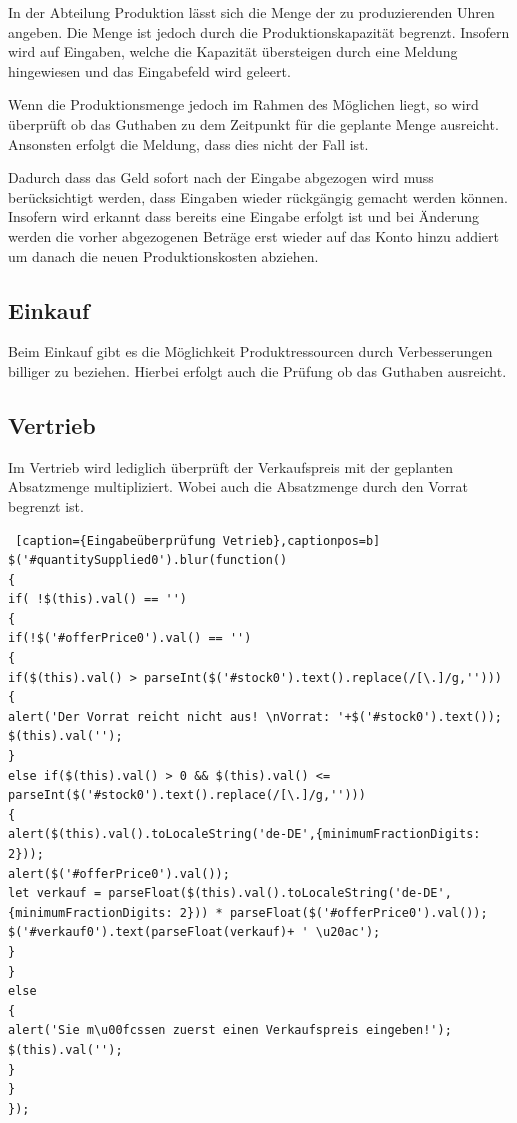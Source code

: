 In der Abteilung Produktion lässt sich die Menge der zu produzierenden Uhren angeben. Die Menge ist jedoch durch die Produktionskapazität begrenzt. Insofern wird auf Eingaben, welche die Kapazität übersteigen durch eine Meldung hingewiesen und das Eingabefeld wird geleert. 

Wenn die Produktionsmenge jedoch im Rahmen des Möglichen liegt, so wird überprüft ob das Guthaben zu dem Zeitpunkt für die geplante Menge ausreicht. Ansonsten erfolgt die Meldung, dass dies nicht der Fall ist. 

Dadurch dass das Geld sofort nach der Eingabe abgezogen wird muss berücksichtigt werden, dass Eingaben wieder rückgängig gemacht werden können. Insofern wird erkannt dass bereits eine Eingabe erfolgt ist und bei Änderung werden die vorher abgezogenen Beträge erst wieder auf das Konto hinzu addiert um danach die neuen Produktionskosten abziehen.

\subsection*{Einkauf}

Beim Einkauf gibt es die Möglichkeit Produktressourcen durch Verbesserungen billiger zu beziehen. Hierbei erfolgt auch die Prüfung ob das Guthaben ausreicht.

\subsection*{Vertrieb}

Im Vertrieb wird lediglich überprüft der Verkaufspreis mit der geplanten Absatzmenge multipliziert. Wobei auch die Absatzmenge durch den Vorrat begrenzt ist.

\lstset{language=Java}
\begin{lstlisting} [caption={Eingabeüberprüfung Vetrieb},captionpos=b]
$('#quantitySupplied0').blur(function()
{
if( !$(this).val() == '')
{
if(!$('#offerPrice0').val() == '')
{
if($(this).val() > parseInt($('#stock0').text().replace(/[\.]/g,'')))
{
alert('Der Vorrat reicht nicht aus! \nVorrat: '+$('#stock0').text());
$(this).val('');
}
else if($(this).val() > 0 && $(this).val() <= parseInt($('#stock0').text().replace(/[\.]/g,'')))
{
alert($(this).val().toLocaleString('de-DE',{minimumFractionDigits: 2}));
alert($('#offerPrice0').val());
let verkauf = parseFloat($(this).val().toLocaleString('de-DE',{minimumFractionDigits: 2})) * parseFloat($('#offerPrice0').val());
$('#verkauf0').text(parseFloat(verkauf)+ ' \u20ac');
}
}
else
{
alert('Sie m\u00fcssen zuerst einen Verkaufspreis eingeben!');
$(this).val('');
}
}
});
\end{lstlisting}

